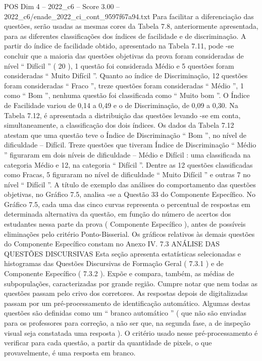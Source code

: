 \begin{textsample}{POS Dim 4 – 2022\_c6 – Score 3.00 – 2022\_c6/enade\_2022\_ci\_cont\_9597f67a94.txt}
Para facilitar a diferenciação das questões, serão usadas as mesmas cores da Tabela 7.8, anteriormente apresentada, para as diferentes classificações dos índices de facilidade e de discriminação.
A partir do índice de facilidade obtido, apresentado na Tabela 7.11, pode -se concluir que a maioria das questões objetivas da prova foram consideradas de nível “ Difícil ” ( 20 ), 1 questão foi considerada Médio e 5 questões foram consideradas “ Muito Difícil ”.
Quanto ao índice de Discriminação, 12 questões foram consideradas “ Fraco ”, treze questões foram consideradas “ Médio ”, 1 como “ Bom ”, nenhuma questão foi classificada como “ Muito bom ”.
O Índice de Facilidade variou de 0,14 a 0,49 e o de Discriminação, de 0,09 a 0,30.
Na Tabela 7.12, é apresentada a distribuição das questões levando -se em conta, simultaneamente, a classificação dos dois índices.
Os dados da Tabela 7.12 atestam que uma questão teve o Índice de Discriminação “ Bom ”, no nível de dificuldade – Difícil.
Treze questões que tiveram Índice de Discriminação “ Médio ” figuraram em dois níveis de dificuldade – Médio e Difícil : uma classificada na categoria Médio e 12, na categoria “ Difícil ”.
Dentre as 12 questões classificadas como Fracas, 5 figuraram no nível de dificuldade “ Muito Difícil ” e outras 7 no nível “ Difícil ”.
A título de exemplo das análises do comportamento das questões objetivas, no Gráfico 7.5, analisa -se a Questão 33 do Componente Específico.
No Gráfico 7.5, cada uma das cinco curvas representa o percentual de respostas em determinada alternativa da questão, em função do número de acertos dos estudantes nessa parte da prova ( Componente Específico ), antes de possíveis eliminações pelo critério Ponto-Bisserial.
Os gráficos relativos às demais questões do Componente Específico constam no Anexo IV. 7.3 ANÁLISE DAS QUESTÕES DISCURSIVAS Esta seção apresenta estatísticas selecionadas e histogramas das Questões Discursivas de Formação Geral ( 7.3.1 ) e de Componente Específico ( 7.3.2 ).
Expõe e compara, também, as médias de subpopulações, caracterizadas por grande região.
Cumpre notar que nem todas as questões passam pelo crivo dos corretores.
As respostas depois de digitalizadas passam por um pré-processamento de identificação automático.
Algumas destas questões são definidas como um “ branco automático ” ( que não são enviadas para os professores para correção, a não ser que, na segunda fase, a de inspeção visual seja constatada uma resposta ).
O critério usado nesse pré-processamento é verificar para cada questão, a partir da quantidade de pixels, o que provavelmente, é uma resposta em branco.

\end{textsample}
